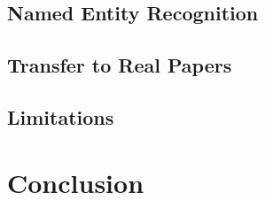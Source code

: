 \documentclass[conference]{IEEEtran}
\begin{document}
\subsection{Named Entity Recognition}
\subsection{Transfer to Real Papers}
\subsection{Limitations}

\section{Conclusion}



\end{document}
